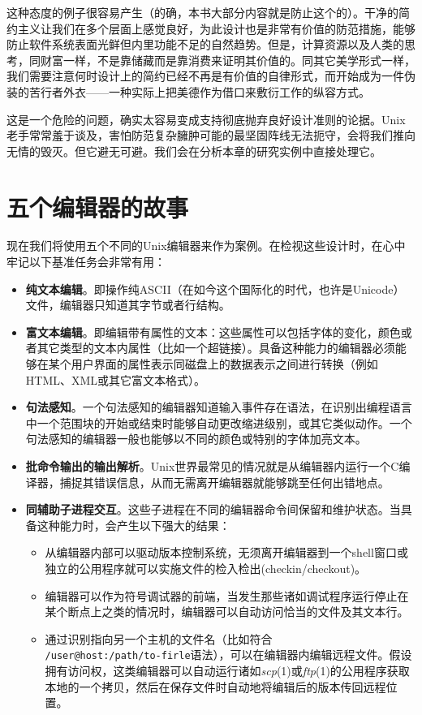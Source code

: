 \documentclass[12pt,oneside]{ctexbook}
\begin{document}
\begin{common-format}
这种态度的例子很容易产生（的确，本书大部分内容就是防止这个的）。干净的简约主义让我们在多个层面上感觉良好，为此设计也是非常有价值的防范措施，能够防止软件系统表面光鲜但内里功能不足的自然趋势。但是，计算资源以及人类的思考，同财富一样，不是靠储藏而是靠消费来证明其价值的。同其它美学形式一样，我们需要注意何时设计上的简约已经不再是有价值的自律形式，而开始成为一件伪装的苦行者外衣——一种实际上把美德作为借口来敷衍工作的纵容方式。

这是一个危险的问题，确实太容易变成支持彻底抛弃良好设计准则的论据。Unix老手常常羞于谈及，害怕防范复杂臃肿可能的最坚固阵线无法扼守，会将我们推向无情的毁灭。但它避无可避。我们会在分析本章的研究实例中直接处理它。


\section{五个编辑器的故事}
现在我们将使用五个不同的Unix编辑器来作为案例。在检视这些设计时，在心中牢记以下基准任务会非常有用：
\begin{itemize}
\item \textbf{纯文本编辑}。即操作纯ASCII（在如今这个国际化的时代，也许是Unicode）文件，编辑器只知道其字节或者行结构。
\item \textbf{富文本编辑}。即编辑带有属性的文本：这些属性可以包括字体的变化，颜色或者其它类型的文本内属性（比如一个超链接）。具备这种能力的编辑器必须能够在某个用户界面的属性表示同磁盘上的数据表示之间进行转换（例如HTML、XML或其它富文本格式）。
\item \textbf{句法感知}。一个句法感知的编辑器知道输入事件存在语法，在识别出编程语言中一个范围块的开始或结束时能够自动更改缩进级别，或其它类似动作。一个句法感知的编辑器一般也能够以不同的颜色或特别的字体加亮文本。
\item \textbf{批命令输出的输出解析}。Unix世界最常见的情况就是从编辑器内运行一个C编译器，捕捉其错误信息，从而无需离开编辑器就能够跳至任何出错地点。
\item \textbf{同辅助子进程交互}。这些子进程在不同的编辑器命令间保留和维护状态。当具备这种能力时，会产生以下强大的结果：
\begin{itemize}
\item 从编辑器内部可以驱动版本控制系统，无须离开编辑器到一个shell窗口或独立的公用程序就可以实施文件的检入检出(checkin/checkout)。
\item 编辑器可以作为符号调试器的前端，当发生那些诸如调试程序运行停止在某个断点上之类的情况时，编辑器可以自动访问恰当的文件及其文本行。
\item 通过识别指向另一个主机的文件名（比如符合\\ \verb+/user@host:/path/to-firle+语法），可以在编辑器内编辑远程文件。假设拥有访问权，这类编辑器可以自动运行诸如\textit{scp}(1)或\textit{ftp}(1)的公用程序获取本地的一个拷贝，然后在保存文件时自动地将编辑后的版本传回远程位置。
\end{itemize}
\end{itemize}


\end{common-format}
\end{document}
